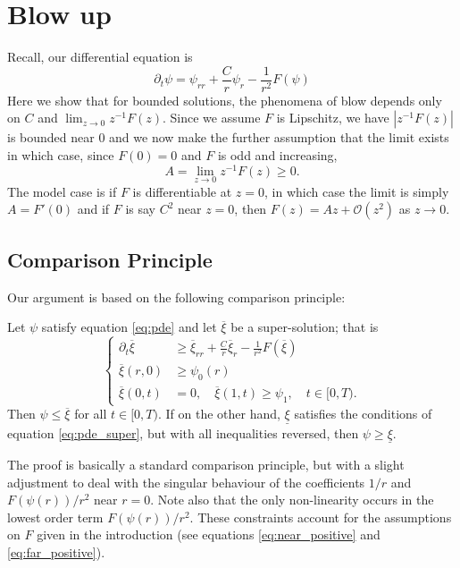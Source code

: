 \documentclass{amsart}
\begin{document}
\section{Blow up}

Recall, our differential equation is
\[
\partial_t \psi = \psi_{rr} + \frac{C}{r} \psi_r - \frac{1}{r^2} F(\psi)
\]
Here we show that for bounded solutions, the phenomena of blow depends only on \(C\) and \(\lim_{z\to 0} z^{-1} F(z)\). Since we assume \(F\) is Lipschitz, we have \(|z^{-1} F(z)|\) is bounded near \(0\) and we now make the further assumption that the limit exists in which case, since \(F(0) = 0\) and \(F\) is odd and increasing,
\[
A = \lim_{z\to 0} z^{-1} F(z) \geq 0.
\]
The model case is if \(F\) is differentiable at \(z=0\), in which case the limit is simply \(A = F'(0)\) and if \(F\) is say \(C^2\) near \(z=0\), then \(F(z) = Az + \mathcal{O} (z^2)\) as \(z \to 0\).

\subsection{Comparison Principle}

Our argument is based on the following comparison principle:

\begin{thm}
\label{thm:comparison}
Let \(\psi\) satisfy equation \eqref{eq:pde} and let \(\overline{\xi}\) be a super-solution; that is
\begin{equation}
\label{eq:pde_super}
\begin{cases}
\partial_t \overline{\xi} &\geq \overline{\xi}_{rr} + \frac{C}{r} \overline{\xi}_r - \frac{1}{r^2} F(\overline{\xi}) \\
\overline{\xi}(r, 0) &\geq \psi_0(r) \\
\overline{\xi}(0, t) &= 0, \quad \overline{\xi}(1, t) \geq \psi_1, \quad t \in [0, T).
\end{cases}
\end{equation}
Then \(\psi \leq \overline{\xi}\) for all \(t \in [0, T)\). If on the other hand, \(\underline{\xi}\) satisfies the conditions of equation \eqref{eq:pde_super}, but with all inequalities reversed, then \(\psi \geq \underline{\xi}\).
\end{thm}

The proof is basically a standard comparison principle, but with a slight adjustment to deal with the singular behaviour of the coefficients \(1/r\) and \(F(\psi(r))/r^2\) near \(r=0\). Note also that the only non-linearity occurs in the lowest order term \(F(\psi(r))/r^2\). These constraints account for the assumptions on \(F\) given in the introduction (see equations \eqref{eq:near_positive} and \eqref{eq:far_positive}).
\end{document}
